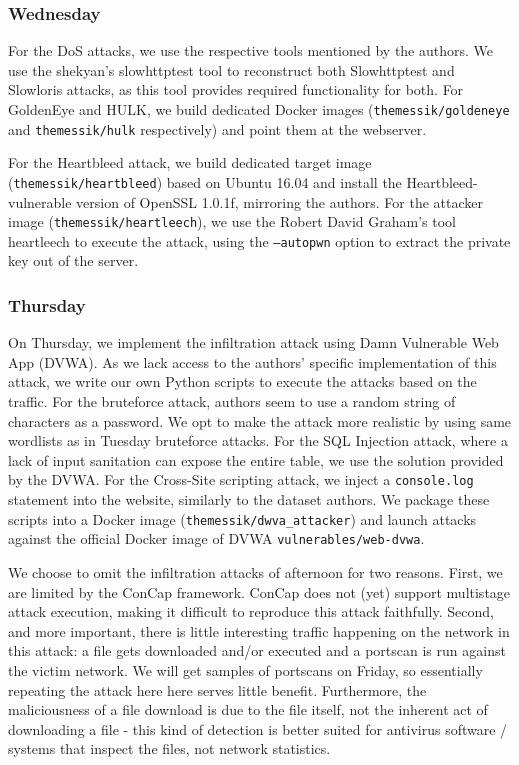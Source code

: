 \subsubsection{Wednesday}
For the DoS attacks, we use the respective tools mentioned by the authors. We use the shekyan's slowhttptest \cite{slowhttptest} tool to reconstruct both Slowhttptest and Slowloris attacks, as this tool provides required functionality for both. For GoldenEye and HULK, we build dedicated Docker images (\texttt{themessik/goldeneye} and \texttt{themessik/hulk} respectively) and point them at the webserver.

For the Heartbleed attack, we build dedicated target image (\texttt{themessik/heartbleed}) based on Ubuntu 16.04 and install the Heartbleed-vulnerable version of OpenSSL 1.0.1f, mirroring the authors. For the attacker image (\texttt{themessik/heartleech}), we use the Robert David Graham's tool heartleech \cite{heartleech} to execute the attack, using the \texttt{--autopwn} option to extract the private key out of the server. 

\subsubsection{Thursday}
On Thursday, we implement the infiltration attack using Damn Vulnerable Web App (DVWA). As we lack access to the authors' specific implementation of this attack, we write our own Python scripts to execute the attacks based on the traffic. For the bruteforce attack, authors seem to use a random string of characters as a password. We opt to make the attack more realistic by using same wordlists as in Tuesday bruteforce attacks. For the SQL Injection attack, where a lack of input sanitation can expose the entire table, we use the solution provided by the DVWA. For the Cross-Site scripting attack, we inject a \texttt{console.log} statement into the website, similarly to the dataset authors. We package these scripts into a Docker image (\texttt{themessik/dwva\_attacker}) and launch attacks against the official Docker image of DVWA \texttt{vulnerables/web-dvwa}.
	
We choose to omit the infiltration attacks of afternoon for two reasons. 
First, we are limited by the ConCap framework. ConCap does not (yet) support multistage attack execution, making it difficult to reproduce this attack faithfully.
Second, and more important, there is little interesting traffic happening on the network in this attack: a file gets downloaded and/or executed and a portscan is run against the victim network. We will get samples of portscans on Friday, so essentially repeating the attack here here serves little benefit. Furthermore, the maliciousness of a file download is due to the file itself, not the inherent act of downloading a file - this kind of detection is better suited for antivirus software / systems that inspect the files, not network statistics.

